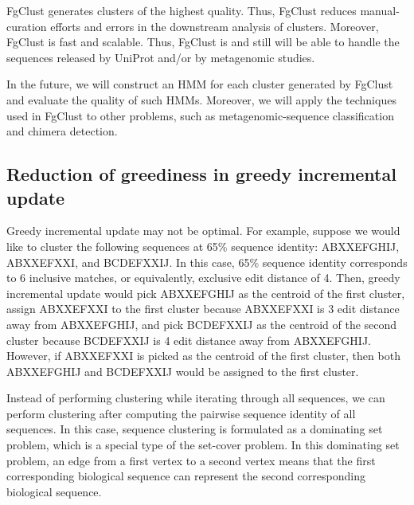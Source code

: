 \documentclass[11pt,letterpaper]{article}
\begin{document}
FgClust generates clusters of the highest quality. 
Thus, FgClust reduces manual-curation efforts and errors in the downstream analysis of clusters.
Moreover, FgClust is fast and scalable.
Thus, FgClust is and still will be able to handle the sequences released by UniProt and/or by metagenomic studies.

In the future, we will construct an HMM for each cluster generated by FgClust and evaluate the quality of such HMMs.
Moreover, we will apply the techniques used in FgClust to other problems, such as metagenomic-sequence classification and chimera detection.%


%


\iffalse

\subsection{Reduction of greediness in greedy incremental update}

Greedy incremental update may not be optimal.
For example, suppose we would like to cluster the following sequences at 65\% sequence identity:
ABXXEFGHIJ, 
ABXXEFXXI, and
BCDEFXXIJ.
In this case, 65\% sequence identity corresponds to 6 inclusive matches, or equivalently, exclusive edit distance of 4.
Then, greedy incremental update would pick ABXXEFGHIJ as the centroid of the first cluster, 
assign ABXXEFXXI to the first cluster because ABXXEFXXI is 3 edit distance away from ABXXEFGHIJ, 
and pick BCDEFXXIJ as the centroid of the second cluster because BCDEFXXIJ is 4 edit distance away from ABXXEFGHIJ.
However, if ABXXEFXXI is picked as the centroid of the first cluster, then both ABXXEFGHIJ and BCDEFXXIJ would be assigned to the first cluster. 

Instead of performing clustering while iterating through all sequences, we can perform clustering after computing the pairwise sequence identity of all sequences. 
In this case, sequence clustering is formulated as a dominating set problem, which is a special type of the set-cover problem. 
In this dominating set problem, an edge from a first vertex to a second vertex means that the first corresponding biological sequence can represent the second corresponding biological sequence. 
\end{document}
